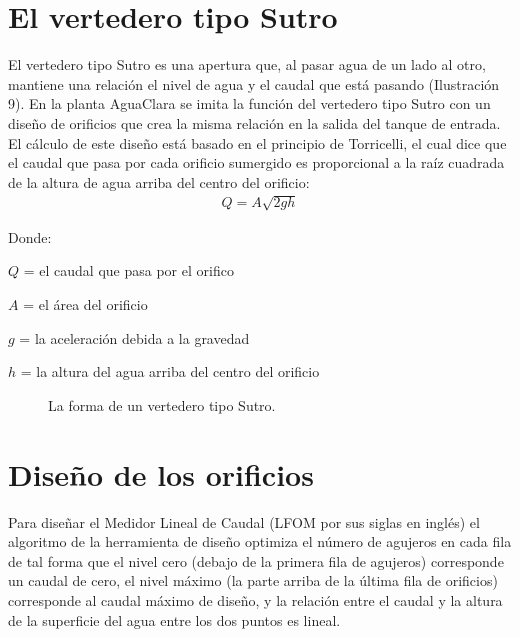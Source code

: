 \documentclass[letterpaper,10pt,spanish]{sphinxmanual}
\let\sphinxpxdimen\pdfpxdimen\else\newdimen\sphinxpxdimen
\begin{document}
\section{El vertedero tipo Sutro}
\label{\detokenize{Entrance_Tank/LFOM:el-vertedero-tipo-sutro}}\label{\detokenize{Entrance_Tank/LFOM:heading-el-vertedero-tipo-sutro}}
El vertedero tipo Sutro es una apertura que, al pasar agua de un lado al otro, mantiene una relación  el nivel de agua y el caudal que está pasando (Ilustración 9). En la planta AguaClara se imita la función del vertedero tipo Sutro con un diseño de orificios que crea la misma relación en la salida del tanque de entrada. El cálculo de este diseño está basado en el principio de Torricelli, el cual dice que el caudal que pasa por cada orificio sumergido es proporcional a la raíz cuadrada de la altura de agua arriba del centro del orificio:
\begin{equation}\label{equation:Entrance_Tank/LFOM:orifice_equation}
\begin{split}  Q = A \sqrt{2gh}\end{split}
\end{equation}
\begin{DUlineblock}{0em}
\item[] Donde:
\item[] \(Q\) = el caudal que pasa por el orifico
\item[] \(A\) = el área del orificio
\item[] \(g\) = la aceleración debida a la gravedad
\item[] \(h\) = la altura del agua arriba del centro del orificio
\end{DUlineblock}

\begin{figure}[htbp]
\centering
\capstart

\noindent\sphinxincludegraphics[width=500\sphinxpxdimen]{{sutro}.png}
\caption{La forma de un vertedero tipo Sutro.}\label{\detokenize{Entrance_Tank/LFOM:id1}}\label{\detokenize{Entrance_Tank/LFOM:figure-sutro}}\end{figure}


\section{Diseño de los orificios}
\label{\detokenize{Entrance_Tank/LFOM:diseno-de-los-orificios}}\label{\detokenize{Entrance_Tank/LFOM:heading-diseno-de-los-orificios}}
Para diseñar el Medidor Lineal de Caudal (LFOM por sus siglas en inglés) el algoritmo de la herramienta de diseño optimiza el número de agujeros en cada fila de tal forma que el nivel cero (debajo de la primera fila de agujeros) corresponde un caudal de cero, el nivel máximo (la parte arriba de la última fila de orificios) corresponde al caudal máximo de diseño, y la relación entre el caudal y la altura de la superficie del agua entre los dos puntos es lineal.
\end{document}

